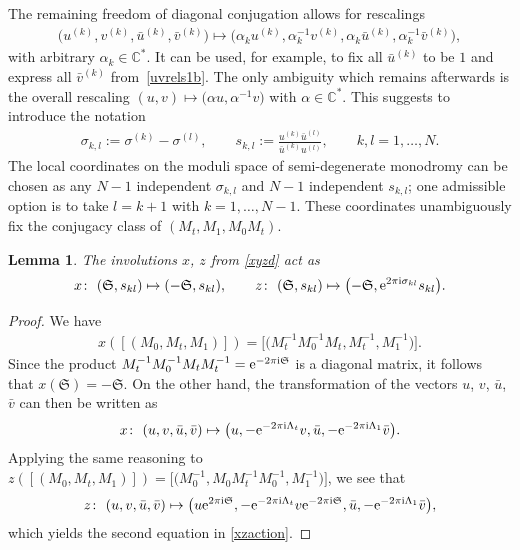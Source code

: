 \documentclass[pdftex]{sigma}
\newcommand\Cb{\mathbb{C}}
\numberwithin{equation}{section}
\newtheorem{Lemma}[Theorem]{Lemma}
\begin{document}
The remaining freedom of diagonal conjugation allows for rescalings
\begin{gather*}
\big(u^{(k)},v^{(k)},\bar u^{(k)},\bar v^{(k)}\big)\mapsto \big(\alpha_k u^{(k)},\alpha_k^{-1}v^{(k)},\alpha_k\bar u^{(k)},\alpha_k^{-1}\bar v^{(k)}\big),
\end{gather*}
with arbitrary $\alpha_k\in\Cb^*$. It can be used, for example, to fix all $\bar u^{(k)}$ to be $1$ and express all $\bar v^{(k)}$ from~\eqref{uvrels1b}. The only ambiguity which remains afterwards is the overall rescaling $(u,v)\mapsto \big(\alpha u,\alpha^{-1} v\big)$ with $\alpha\in\Cb^*$. This suggests to introduce the notation
\begin{gather}\label{skldef}
\sigma_{k,l}:=\sigma^{(k)}-\sigma^{(l)},\qquad s_{k,l}:=\frac{u^{(k)}\bar u^{(l)}}{\bar u^{(k)}u^{(l)}},\qquad k,l=1,\ldots,N.
\end{gather}
The local coordinates on the moduli space of semi-degenerate monodromy can be chosen as any $N-1$ independent $\sigma_{k,l}$ and $N-1$ independent $s_{k,l}$; one admissible option is to take $l=k+1$ with $k=1,\ldots,N-1$. These coordinates unambiguously fix the conjugacy class of $(M_t,M_1,M_0M_t)$.
\begin{Lemma}The involutions $x$, $z$ from \eqref{xyzd} act as
\begin{gather}\label{xzaction}
x\colon \ (\mathfrak S,s_{kl})\mapsto (-\mathfrak S,s_{kl}),\qquad z\colon \ (\mathfrak S,s_{kl}) \mapsto \bigl({-}\mathfrak S, {\rm e}^{2\pi{\rm i} \sigma_{kl}}s_{kl}\bigr).
\end{gather}
\end{Lemma}
\begin{proof} We have
\begin{gather*} x( [(M_0,M_t,M_1) ])=\big[\big(M_t^{-1}M_0^{-1}M_t,M_t^{-1},M_1^{-1}\big)\big].\end{gather*} Since the product $M_t^{-1}M_0^{-1}M_t M_t^{-1}={\rm e}^{-2\pi{\rm i}\mathfrak S}$ is a diagonal matrix, it follows that $x(\mathfrak S)=-\mathfrak S$. On the other hand, the transformation of the vectors $u$, $v$, $\bar u$, $\bar v$ can then be written as
\begin{gather*}
x\colon \ ( u,v,\bar u,\bar v) \mapsto \big(u,-{\rm e}^{-2\pi{\rm i} \Lambda_t}v,\bar u,-{\rm e}^{-2\pi{\rm i} \Lambda_1}\bar v\big).
\end{gather*}
Applying the same reasoning to $z( [( M_0,M_t,M_1) ])=\big[\big( M_0^{-1}, M_0 M_t^{-1}M_0^{-1},M_1^{-1}\big)\big] $, we see that
\begin{gather*}
z\colon \ ( u,v,\bar u,\bar v )\mapsto \big(u {\rm e}^{2\pi{\rm i} \mathfrak S},-{\rm e}^{-2\pi{\rm i} \Lambda_t}v {\rm e}^{-2\pi{\rm i}\mathfrak S},\bar u, -{\rm e}^{-2\pi{\rm i} \Lambda_1}\bar v\big),
\end{gather*}
which yields the second equation in \eqref{xzaction}.
\end{proof}
\end{document}
